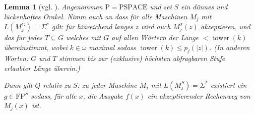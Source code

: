 \documentclass[nofonts]{uebung}
\newtheorem{lemma}[theorem]{Lemma}
\theoremstyle{definition}
\def\P{\ensuremath{\mathrm{P}}}
\def\FP{\ensuremath{\mathrm{FP}}}
\def\PSPACE{\ensuremath{\mathrm{PSPACE}}}
\DeclareMathOperator{\tower}{tower}
\begin{document}
\begin{lemma}[vgl. \cite{fortnow_separability_2002}]\label{thm:q-algorithmus}
    Angenommen $\P=\PSPACE$ und sei $S$ ein dünnes und lückenhaftes Orakel. %
    Nimm auch an dass für alle Maschinen $M_j$ mit $L(M_j^G)=\Sigma^*$ gilt: für hinreichend langes $z$ wird auch $M_j^T(z)$ akzeptieren, und das für jedes $T\subseteq G$ welches mit $G$ auf allen Wörtern der Länge $<\tower(k)$ übereinstimmt, wobei $k\in\omega$ maximal sodass $\tower(k)\leq p_j(|z|)$.
    (In anderen Worten: $G$ und $T$ stimmen bis zur (exklusive) höchsten abfragbaren Stufe erlaubter Länge überein.)

    Dann gilt $Q$ relativ zu $S$: zu jeder Maschine $M_j$ mit $L(M_j^S)=\Sigma^*$ existiert ein $g\in\FP^S$ sodass, für alle $x$, die Ausgabe $f(x)$ ein akzeptierender Rechenweg von $M_j(x)$ ist. 
\end{lemma}
\end{document}
